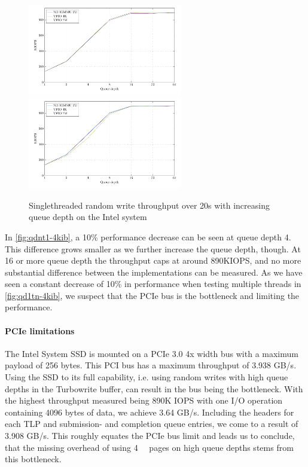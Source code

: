 \begin{figure}[H]
  \centering
   {\includegraphics[width=0.6\textwidth]{figures/qdnt1_1page}}
   {\includegraphics[width=0.6\textwidth]{figures/qdnt1_512page}}
  \caption{Singlethreaded random write throughput over 20s with increasing queue depth on the Intel system}
  \label{fig:qdnt1-4kib}
\end{figure}

In \autoref{fig:qdnt1-4kib}, a 10\% performance decrease can be seen at queue depth 4. This difference grows smaller as we further increase the queue depth, though. At 16 or more queue depth the throughput caps at around 890KIOPS, and no more substantial difference between the implementations can be measured. As we have seen a constant decrease of 10\% in performance when testing multiple threads in \autoref{fig:qd1tn-4kib}, we suspect that the PCIe bus is the bottleneck and limiting the performance.

\paragraph{PCIe limitations}
The Intel System SSD is mounted on a PCIe 3.0 4x width bus with a maximum payload of 256 bytes. This PCI bus has a maximum throughput of 3.938 GB/s. Using the SSD to its full capability, i.e. using random writes with high queue depths in the Turbowrite buffer, can result in the bus being the bottleneck. With the highest throughput measured being 890K IOPS with one I/O operation containing 4096 bytes of data, we achieve 3.64 GB/s. Including the headers for each TLP and submission- and completion queue entries, we come to a result of 3.908 GB/s. This roughly equates the PCIe bus limit and leads us to conclude, that the missing overhead of using \qty{4}{\kibi\byte} pages on high queue depths stems from this bottleneck.

